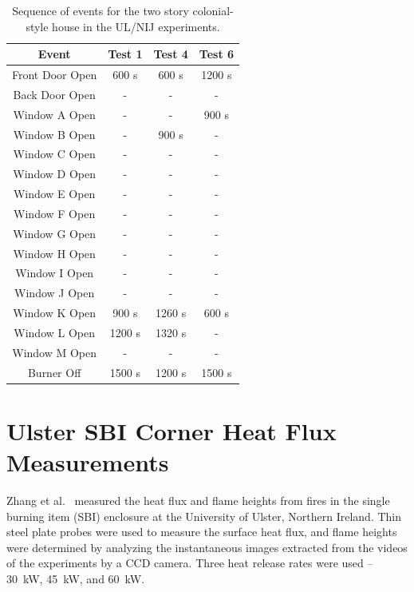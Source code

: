 \begin{table}[ht!]
\centering
\caption[Sequence of events for the two story colonial-style house in the UL/NIJ experiments]
{Sequence of events for the two story colonial-style house in the UL/NIJ experiments.}
\label{Colonial_events}
\begin{tabular}{|c||c|c|c|}
\hline
Event          & Test 1     & Test 4    & Test 6    \\ \hline \hline
Front Door Open & 600 s    & 600 s    & 1200 s    \\ \hline
Back Door Open  & -       & -       & -       \\ \hline
Window A Open     & -       & -       & 900 s    \\ \hline
Window B Open     & -       & 900 s    & -       \\ \hline
Window C Open     & -       & -       & -       \\ \hline
Window D Open     & -       & -       & -       \\ \hline
Window E Open     & -       & -       & -       \\ \hline
Window F Open     & -       & -       & -       \\ \hline
Window G Open     & -       & -       & -       \\ \hline
Window H Open     & -       & -       & -       \\ \hline
Window I Open     & -       & -       & -       \\ \hline
Window J Open     & -       & -       & -       \\ \hline
Window K Open     & 900 s    & 1260 s    & 600 s    \\ \hline
Window L Open     & 1200 s    & 1320 s    & -       \\ \hline
Window M Open     & -       & -       & -       \\ \hline
Burner Off       & 1500 s    & 1200 s    & 1500 s    \\ \hline
\end{tabular}
\end{table}


\FloatBarrier

\section{Ulster SBI Corner Heat Flux Measurements}
\label{Ulster_SBI_Description}

Zhang et al.~\cite{Zhang:IAFSS9} measured the heat flux and flame heights from fires in the single burning item (SBI) enclosure at the University of Ulster, Northern Ireland. Thin steel plate probes were used to measure the surface heat flux, and flame heights were determined by analyzing the instantaneous images extracted from the videos of the experiments by a CCD camera. Three heat release rates were used -- 30~kW, 45~kW, and 60~kW.


